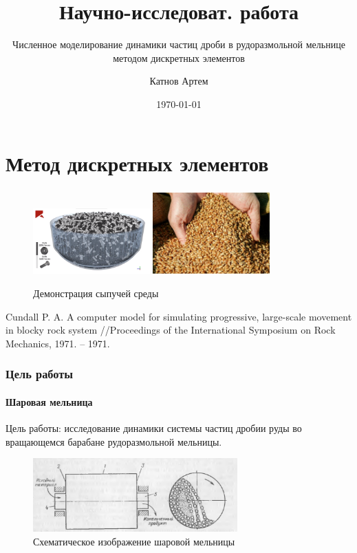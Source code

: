 \documentclass[c]{beamer}  %
\title{Научно-исследоват. работа}
\subtitle{Численное моделирование динамики частиц дроби в рудоразмольной мельнице методом дискретных элементов}
\author{Катнов Артем}
\date{\today}
\institute[Факультет робототехники и комплексной автоматизации]{Московский государственный технический университет им. Н.Э.Баумана}
\begin{document}
\begin{frame}
\maketitle
\end{frame}


\begin{frame}
\tableofcontents
\end{frame}

\section{Метод дискретных элементов}

\begin{frame}
\frametitle{\insertsection} 
\framesubtitle{\insertsubsection}

\begin{figure}[h!]
	\centering
	\includegraphics[width=0.4\textwidth]{sreda}
	\includegraphics[width=0.4\textwidth]{sreda2}
	\caption{Демонстрация сыпучей среды}
\end{figure} 

Cundall P. A. A computer model for simulating progressive, large-scale movement in blocky rock system //Proceedings of the International Symposium on Rock Mechanics, 1971. – 1971.

\end{frame}

\begin{frame}
\frametitle{Цель работы} 
\framesubtitle{Шаровая мельница}

Цель работы: исследование динамики системы частиц дробии руды во вращающемся барабане рудоразмольной мельницы.

\begin{figure}[h!]
	\centering
	\includegraphics[width=0.7\textwidth]{baraban_shema}
	\caption{Схематическое изображение шаровой мельницы}
\end{figure}

 
\end{frame}
\end{document}
